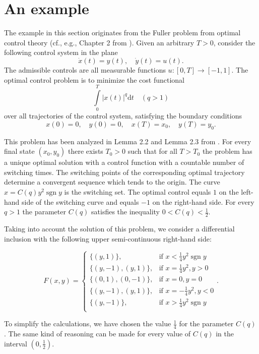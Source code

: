 \documentclass[a4paper]{article}
\DeclareMathOperator{\sgn}{sgn}
\begin{document}
\section{An example}\label{example}

The example in this section originates from the Fuller problem from optimal control theory (cf., e.g., Chapter 2 from \cite{ZB}). Given an arbitrary $T>0$, consider the following control system in the plane $$\dot{x}(t) = y(t),\quad \dot{y}(t) = u(t).$$ The admissible controls are all measurable functions $u:[0,T] \to [-1,1]$.  The optimal control problem is to minimize  the cost functional $$\int\limits_{0}^{T} |x(t)|^q \mathrm{d}t \quad (q > 1)$$ over all trajectories of the control system, satisfying the boundary conditions $$x(0)=0,\quad y(0)=0,\quad x(T)=x_0,\quad y(T)=y_0.$$

This problem has been analyzed in Lemma 2.2 and Lemma 2.3 from \cite{ZB}. For every final state $(x_0,y_0)$ there exists $T_0 > 0$ such that for all $T>T_0$ the problem has a unique optimal solution with a control function with a countable number of switching times. The switching points of the corresponding optimal trajectory determine a convergent sequence which tends to the origin. The curve $x=C(q)y^2\sgn{y}$ is the switching set. The optimal control equals $1$ on the left-hand side of the switching curve and equals $-1$ on the right-hand side. For every $q>1$ the parameter $C(q)$ satisfies the inequality $0 < C(q) < \frac{1}{2}$.

Taking into account the solution of this problem, we consider a differential inclusion with the following upper semi-continuous right-hand side:

\begin{equation*}
    F(x,y) = \begin{cases}
        \{(y,1)\}, &\text{if } x < \frac{1}{4}y^2 \sgn y\\
        \{(y,-1),(y,1)\}, &\text{if } x = \frac{1}{4}y^2, y>0\\
        \{(0,1),(0,-1)\}, &\text{if } x=0,y=0\\
        \{(y,-1),(y,1)\}, &\text{if } x = -\frac{1}{4}y^2, y<0\\
        \{(y,-1)\}, &\text{if } x > \frac{1}{4}y^2 \sgn y\\
    \end{cases}.
\end{equation*}

To simplify the calculations, we have chosen the value $\frac{1}{4}$ for the parameter $C(q)$. The same kind of reasoning can be made for every value of $C(q)$ in the interval $\left(0,\frac{1}{2}\right)$.
\end{document}
